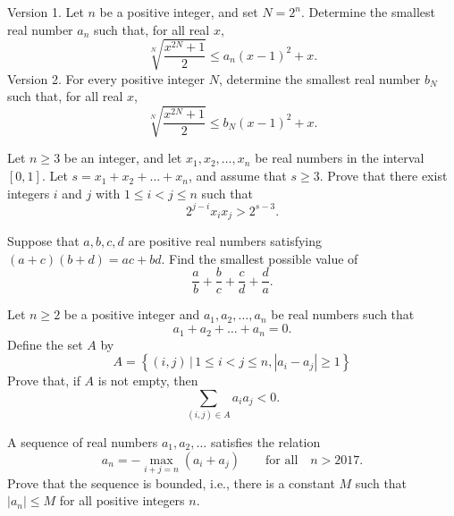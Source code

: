 \documentclass[11pt]{scrartcl}
\begin{document}
\begin{Problem}
Version 1. Let $n$ be a positive integer, and set $N=2^{n}$. Determine the smallest real number $a_{n}$ such that, for all real $x$,
\[
\sqrt[N]{\frac{x^{2 N}+1}{2}} \leqslant a_{n}(x-1)^{2}+x .
\]Version 2. For every positive integer $N$, determine the smallest real number $b_{N}$ such that, for all real $x$,
\[
\sqrt[N]{\frac{x^{2 N}+1}{2}} \leqslant b_{N}(x-1)^{2}+x .
\]
\end{Problem}




\begin{Problem}
Let $n \geqslant 3$ be an integer, and let $x_1,x_2,\ldots,x_n$ be real numbers in the interval $[0,1]$. Let $s=x_1+x_2+\ldots+x_n$, and assume that $s \geqslant 3$. Prove that there exist integers $i$ and $j$ with $1 \leqslant i<j \leqslant n$ such that
\[2^{j-i}x_ix_j>2^{s-3}.\]
\end{Problem}

\begin{Problem}
Suppose that $a,b,c,d$ are positive real numbers satisfying $(a+c)(b+d)=ac+bd$. Find the smallest possible value of
$$\frac{a}{b}+\frac{b}{c}+\frac{c}{d}+\frac{d}{a}.$$
\end{Problem}



\begin{Problem}
Let $n\geqslant 2$ be a positive integer and $a_1,a_2, \ldots ,a_n$ be real numbers such that\[a_1+a_2+\dots+a_n=0.\]Define the set $A$ by
\[A=\left\{(i, j)\,|\,1 \leqslant i<j \leqslant n,\left|a_{i}-a_{j}\right| \geqslant 1\right\}\]Prove that, if $A$ is not empty, then
\[\sum_{(i, j) \in A} a_{i} a_{j}<0.\]
\end{Problem}

\begin{Problem}
A sequence of real numbers $a_1,a_2,\ldots$ satisfies the relation
$$a_n=-\max_{i+j=n}(a_i+a_j)\qquad\text{for all}\quad n>2017.$$Prove that the sequence is bounded, i.e., there is a constant $M$ such that $|a_n|\leq M$ for all positive integers $n$.
\end{Problem}
\end{document}
